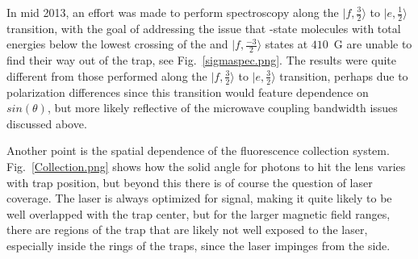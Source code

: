 \documentclass[defaultstyle,11pt]{thesis}
\begin{document}
In mid 2013, an effort was made to perform spectroscopy along the $|f, \frac{3}{2}\rangle$ to $|e, \frac{1}{2}\rangle$ transition, with the goal of addressing the issue that -state molecules with total energies below the lowest crossing of the  and $|f,\frac{-3}{2}\rangle$ states at $410$~G are unable to find their way out of the trap, see Fig.~\ref{sigmaspec.png}.
The results were quite different from those performed along the $|f, \frac{3}{2}\rangle$ to $|e, \frac{3}{2}\rangle$ transition, perhaps due to polarization differences since this transition would feature dependence on $sin(\theta)$, but more likely reflective of the microwave coupling bandwidth issues discussed above.


Another point is the spatial dependence of the fluorescence collection system.
Fig.~\ref{Collection.png} shows how the solid angle for photons to hit the lens varies with trap position, but beyond this there is of course the question of laser coverage.
The laser is always optimized for signal, making it quite likely to be well overlapped with the trap center, but for the larger magnetic field ranges, there are regions of the trap that are likely not well exposed to the laser, especially inside the rings of the traps, since the laser impinges from the side.

\end{document}
